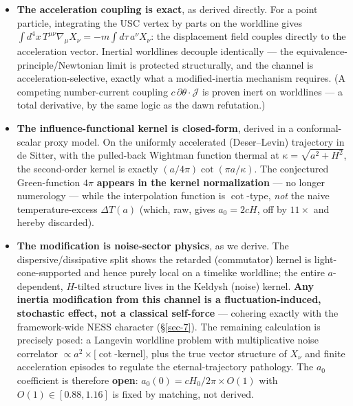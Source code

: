 \documentclass[submission, Phys]{SciPost}
\providecommand{\tightlist}{\setlength{\itemsep}{0pt}\setlength{\parskip}{0pt}}
\begin{document}
\begin{itemize}
\tightlist
\item
  \textbf{The acceleration coupling is exact}, as derived directly. For
  a point particle, integrating the USC vertex by parts on the worldline
  gives
  \(\int d^4x\, T^{\mu\nu}\nabla_\mu X_\nu = -m\int d\tau\, a^\nu X_\nu\):
  the displacement field couples directly to the acceleration vector.
  Inertial worldlines decouple identically --- the
  equivalence-principle/Newtonian limit is protected structurally, and
  the channel is acceleration-selective, exactly what a modified-inertia
  mechanism requires. (A competing number-current coupling
  \(c\,\partial\theta\cdot\mathcal{J}\) is proven inert on worldlines
  --- a total derivative, by the same logic as the dawn refutation.)
\item
  \textbf{The influence-functional kernel is closed-form}, derived in a
  conformal-scalar proxy model. On the uniformly accelerated
  (Deser--Levin) trajectory in de Sitter, with the pulled-back Wightman
  function thermal at \(\kappa = \sqrt{a^2 + H^2}\), the second-order
  kernel is exactly \((a/4\pi)\cot(\pi a/\kappa)\). The conjectured
  Green-function \(4\pi\) \textbf{appears in the kernel normalization}
  --- no longer numerology --- while the interpolation function is
  \(\cot\)-type, \emph{not} the naive temperature-excess \(\Delta T(a)\)
  (which, raw, gives \(a_0 = 2cH\), off by \(11\times\) and hereby
  discarded).
\item
  \textbf{The modification is noise-sector physics}, as we derive. The
  dispersive/dissipative split shows the retarded (commutator) kernel is
  light-cone-supported and hence purely local on a timelike worldline;
  the entire \(a\)-dependent, \(H\)-tilted structure lives in the
  Keldysh (noise) kernel. \textbf{Any inertia modification from this
  channel is a fluctuation-induced, stochastic effect, not a classical
  self-force} --- cohering exactly with the framework-wide NESS
  character (§\ref{sec-7}). The remaining calculation is precisely
  posed: a Langevin worldline problem with multiplicative noise
  correlator \(\propto a^2\times[\cot\)-kernel\(]\), plus the true
  vector structure of \(X_\nu\) and finite acceleration episodes to
  regulate the eternal-trajectory pathology. The \(a_0\) coefficient is
  therefore \textbf{open}: \(a_0(0) = cH_0/2\pi\times O(1)\) with
  \(O(1)\in[0.88, 1.16]\) is fixed by matching, not derived.
\end{itemize}
\end{document}
